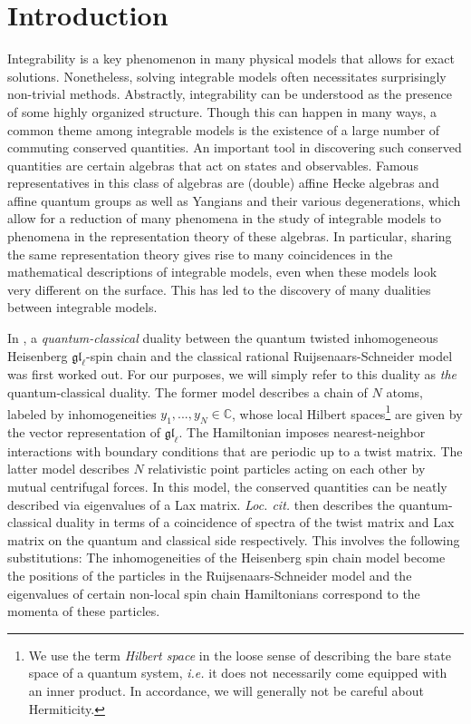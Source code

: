 \documentclass[11pt]{report}
\theoremstyle{definition}
\theoremstyle{remark}
\theoremstyle{remark}
\newcommand{\C}{\mathbb{C}}
\begin{document}
\tableofcontents

\setcounter{chapter}{-1}
\chapter{Introduction}

Integrability \cite{book:arutyunov:elements} is a key phenomenon in many physical models that allows for exact solutions. Nonetheless, solving integrable models often necessitates surprisingly non-trivial methods. Abstractly, integrability can be understood as the presence of some highly organized structure. Though this can happen in many ways, a common theme among integrable models is the existence of a large number of commuting conserved quantities. An important tool in discovering such conserved quantities are certain algebras that act on states and observables. Famous representatives in this class of algebras are (double) affine Hecke algebras and affine quantum groups as well as Yangians and their various degenerations, which allow for a reduction of many phenomena in the study of integrable models to phenomena in the representation theory of these algebras. In particular, sharing the same representation theory gives rise to many coincidences in the mathematical descriptions of integrable models, even when these models look very different on the surface. This has led to the discovery of many dualities between integrable models.

In \cite{article:gorsky:2014}, a \emph{quantum-classical} duality between the quantum twisted inhomogeneous Heisenberg $\mathfrak{gl}_\ell$-spin chain and the classical rational Ruijsenaars-Schneider model was first worked out. For our purposes, we will simply refer to this duality as \emph{the} quantum-classical duality. The former model describes a chain of $N$ atoms, labeled by inhomogeneities $y_1,...,y_N \in \C$, whose local Hilbert spaces\footnote{We use the term \emph{Hilbert space} in the loose sense of describing the bare state space of a quantum system, \emph{i.e.} it does not necessarily come equipped with an inner product. In accordance, we will generally not be careful about Hermiticity.} are given by the vector representation of $\mathfrak{gl}_\ell$. The Hamiltonian imposes nearest-neighbor interactions with boundary conditions that are periodic up to a twist matrix. The latter model describes $N$ relativistic point particles acting on each other by mutual centrifugal forces. In this model, the conserved quantities can be neatly described via eigenvalues of a Lax matrix. \emph{Loc. cit.} then describes the quantum-classical duality in terms of a coincidence of spectra of the twist matrix and Lax matrix on the quantum and classical side respectively. This involves the following substitutions: The inhomogeneities of the Heisenberg spin chain model become the positions of the particles in the Ruijsenaars-Schneider model and the eigenvalues of certain non-local spin chain Hamiltonians correspond to the momenta of these particles.
\end{document}
